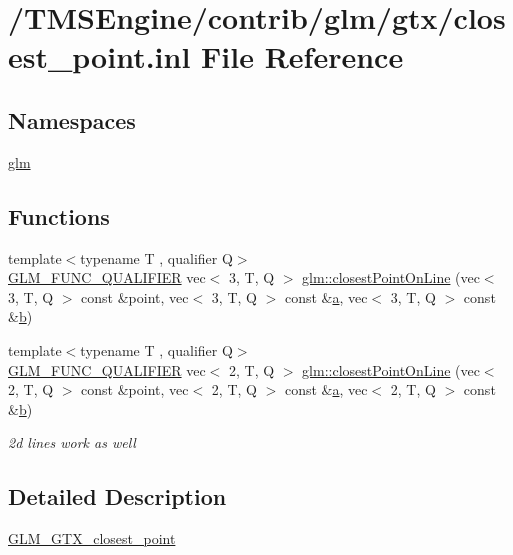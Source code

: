 \hypertarget{closest__point_8inl}{}\section{/\+T\+M\+S\+Engine/contrib/glm/gtx/closest\+\_\+point.inl File Reference}
\label{closest__point_8inl}
\subsection*{Namespaces}
\begin{DoxyCompactItemize}
\item 
 \hyperlink{namespaceglm}{glm}
\end{DoxyCompactItemize}
\subsection*{Functions}
\begin{DoxyCompactItemize}
\item 
{\footnotesize template$<$typename T , qualifier Q$>$ }\\\hyperlink{setup_8hpp_a33fdea6f91c5f834105f7415e2a64407}{G\+L\+M\+\_\+\+F\+U\+N\+C\+\_\+\+Q\+U\+A\+L\+I\+F\+I\+ER} vec$<$ 3, T, Q $>$ \hyperlink{group__gtx__closest__point_ga36529c278ef716986151d58d151d697d}{glm\+::closest\+Point\+On\+Line} (vec$<$ 3, T, Q $>$ const \&point, vec$<$ 3, T, Q $>$ const \&\hyperlink{_s_d_l__opengl__glext_8h_a3309789fc188587d666cda5ece79cf82}{a}, vec$<$ 3, T, Q $>$ const \&\hyperlink{_s_d_l__opengl__glext_8h_a0f71581a41fd2264c8944126dabbd010}{b})
\item 
{\footnotesize template$<$typename T , qualifier Q$>$ }\\\hyperlink{setup_8hpp_a33fdea6f91c5f834105f7415e2a64407}{G\+L\+M\+\_\+\+F\+U\+N\+C\+\_\+\+Q\+U\+A\+L\+I\+F\+I\+ER} vec$<$ 2, T, Q $>$ \hyperlink{group__gtx__closest__point_ga55bcbcc5fc06cb7ff7bc7a6e0e155eb0}{glm\+::closest\+Point\+On\+Line} (vec$<$ 2, T, Q $>$ const \&point, vec$<$ 2, T, Q $>$ const \&\hyperlink{_s_d_l__opengl__glext_8h_a3309789fc188587d666cda5ece79cf82}{a}, vec$<$ 2, T, Q $>$ const \&\hyperlink{_s_d_l__opengl__glext_8h_a0f71581a41fd2264c8944126dabbd010}{b})
\begin{DoxyCompactList}\small\item\em 2d lines work as well \end{DoxyCompactList}\end{DoxyCompactItemize}


\subsection{Detailed Description}
\hyperlink{group__gtx__closest__point}{G\+L\+M\+\_\+\+G\+T\+X\+\_\+closest\+\_\+point} 